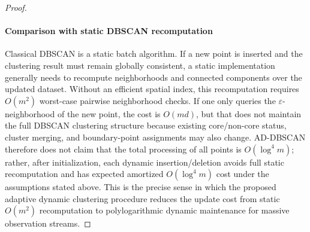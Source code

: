 \documentclass[preprint,12pt,authoryear]{elsarticle}
\theoremstyle{definition}
\begin{document}
\begin{proof}
\paragraph{Comparison with static DBSCAN recomputation}
Classical DBSCAN is a static batch algorithm. If a new point is inserted and the clustering result must remain globally consistent, a static implementation generally needs to recompute neighborhoods and connected components over the updated dataset. Without an efficient spatial index, this recomputation requires $O(m^2)$ worst-case pairwise neighborhood checks. If one only queries the $\varepsilon$-neighborhood of the new point, the cost is $O(md)$, but that does not maintain the full DBSCAN clustering structure because existing core/non-core status, cluster merging, and boundary-point assignments may also change. AD-DBSCAN therefore does not claim that the total processing of all points is $O(\log^4 m)$; rather, after initialization, each dynamic insertion/deletion avoids full static recomputation and has expected amortized $O(\log^4 m)$ cost under the assumptions stated above. This is the precise sense in which the proposed adaptive dynamic clustering procedure reduces the update cost from static $O(m^2)$ recomputation to polylogarithmic dynamic maintenance for massive observation streams.

\end{proof}
\end{document}
